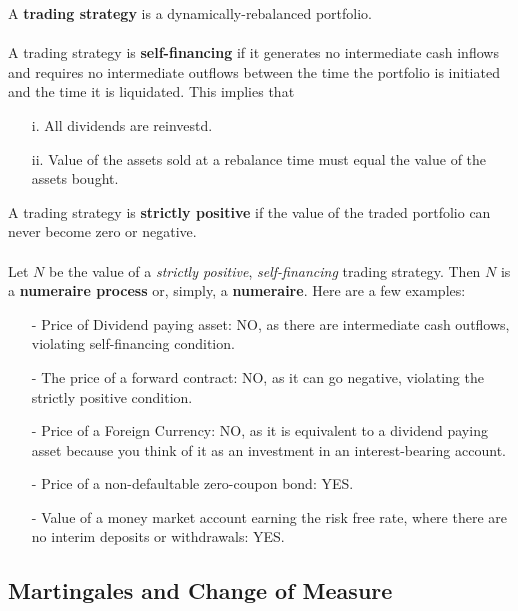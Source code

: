 \documentclass[a4paper,12pt]{scrartcl}
\begin{document}
A \textbf{trading strategy} is a dynamically-rebalanced portfolio.
\\
\\
A trading strategy is \textbf{self-financing} if it generates no 
intermediate cash inflows and requires no intermediate outflows between
the time the portfolio is initiated and the time it is liquidated.  This
implies that
   \begin{itemize}
      \item[i.]{All dividends are reinvestd.}
      \item[ii.]{Value of the assets sold at a rebalance time must 
	 equal the value of the assets bought.}
   \end{itemize}
A trading strategy is \textbf{strictly positive} if the value of the 
traded portfolio can never become zero or negative.
\\
\\ 
Let $N$ be the value of a \emph{strictly positive}, \emph{self-financing}
trading strategy.  Then $N$ is a \textbf{numeraire process} or, simply,
a \textbf{numeraire}. Here are a few examples:
\begin{itemize}
   \item[-]{Price of Dividend paying asset: 
	 NO, as there are intermediate 
	 cash outflows, violating self-financing condition.}
   \item[-]{The price of a forward contract: NO, as it can go negative,
      violating the strictly positive condition.}
   \item[-]{Price of a Foreign Currency: 
      NO, as it is equivalent to a dividend
      paying asset because you think of it as an investment in an
      interest-bearing account.}
   \item[-]{Price of a non-defaultable zero-coupon bond: YES.}
   \item[-]{Value of a money market account earning the risk free rate,
      where there are no interim deposits or withdrawals: YES.}
\end{itemize}

\subsection{Martingales and Change of Measure}
\end{document}
